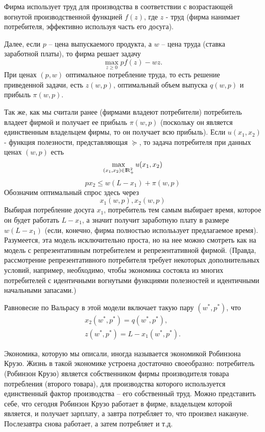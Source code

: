 Фирма использует труд для производства в соответствии с возрастающей
вогнутой производственной функцией $f(z)$, где $z$ - труд (фирма
нанимает потребителя, эффективно используя часть его досуга).

Далее, если $p$ -- цена выпускаемого продукта, а $w$ -- цена труда
(ставка заработной платы), то фирма решает задачу
$$
\max_{z\ge 0}pf(z)-wz.
$$
При ценах $(p,w)$ оптимальное потребление труда, то есть решение
приведенной задачи, есть $z(w,p)$, оптимальный объем выпуска
$q(w,p)$ и прибыль $\pi (w,p)$.

Так же, как мы считали ранее (фирмами владеют потребители)
потребитель владеет фирмой и получает ее прибыль $\pi(w,p)$
(поскольку он является единственным владельцем фирмы, то он получает
всю прибыль). Если $u(x_1,x_2)$ - функция полезности, представляющая
$\succeq$, то задача потребителя при данных ценах $(w,p)$ есть
$$
\max_{(x_1,x_2)\in{\rm I\!R}^2_+}u(x_1,x_2)
$$
$$
px_2\le w(L-x_1)+\pi (w,p)
$$
Обозначим оптимальный спрос здесь через
$$
x_1(w,p),x_2(w,p)
$$
Выбирая потребление досуга $x_1$, потребитель тем самым выбирает
время, которое он будет работать $L-x_1$, а значит получит
заработную плату в размере $w(L-x_1)$ (если, конечно, фирма полностью
исполььзует предлагаемое время).
Разумеется, эта модель исключительно проста, но на нее можно смотреть как на
модель с репрезентативным потребителем и репрезентативной фирмой. (Правда, рассмотрение
репрезентативного потребителя требует некоторых дополнительных условий, например,
необходимо, чтобы экономика состояла из многих потребителей с
идентичными вогнутыми функциями полезностей и идентичными начальными запасами.)

Равновесие по Вальрасу в этой модели включает такую пару
$(w^*,p^*)$, что
$$
\begin{array}{c}
x_2(w^*,p^*)=q(w^*,p^*),\\
z(w^*,p^*)=L-x_1(w^*,p^*).
\end{array}
$$

Экономика, которую мы описали,  иногда называется экономикой
Робинзона Крузо. Жизнь в такой экономике устроена достаточно
своеобразно: потребитель (Робинзон Крузо) является собственником
фирмы производителя товара потребления (второго товара), для
производства которого используется единственный фактор производства
-- его собственный труд. Можно представить себе, что сегодня
Робинзон Крузо работает в фирме, владельцем которой является, и
получает зарплату, а завтра потребляет то, что произвел накануне.
Послезавтра снова работает, а затем потребляет и т.д.

